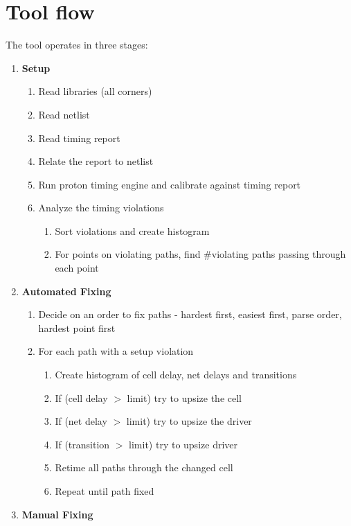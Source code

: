 \documentclass[11pt]{article}
\begin{document}
\section{Tool flow}
The tool operates in three stages:
\begin{enumerate}
\item \textbf{Setup}
	\begin{enumerate}
	\item Read libraries (all corners)
	\item Read netlist
	\item Read timing report
	\item Relate the report to netlist
	\item Run proton timing engine and calibrate against timing report
	\item Analyze the timing violations
		\begin{enumerate}
		\item Sort violations and create histogram
		\item For points on violating paths, find \#violating paths passing through each point
		\end{enumerate}
	\end{enumerate}
\item \textbf{Automated Fixing}
	\begin{enumerate}
	\item Decide on an order to fix paths - hardest first, easiest first, parse order, hardest point first
	\item For each path with a setup violation
		\begin{enumerate}
		\item Create histogram of cell delay, net delays and transitions
		\item If (cell delay $>$ limit) try to upsize the cell
		\item If (net delay  $>$ limit) try to upsize the driver
		\item If (transition $>$ limit) try to upsize driver
		\item Retime all paths through the changed cell
		\item Repeat until path fixed
		\end{enumerate}
	\end{enumerate}
\item \textbf{Manual Fixing}
\end{enumerate}
\end{document}
